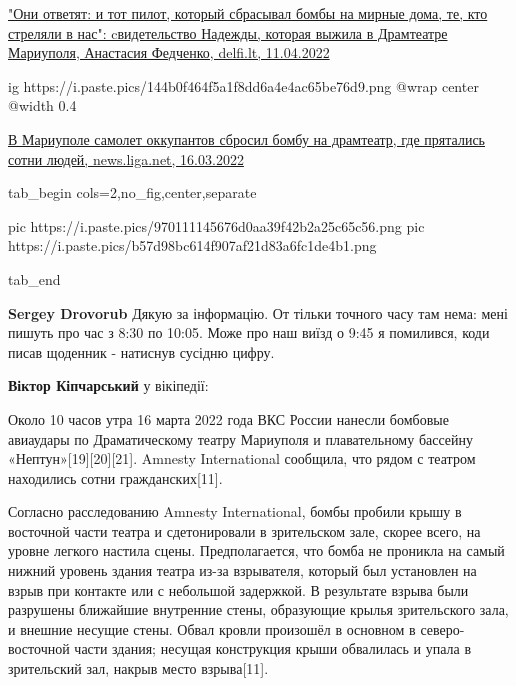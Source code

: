  
 
 
 
 

\begin{itemize} %

\href{https://www.delfi.lt/ru/news/live/oni-otvetyat-i-tot-pilot-kotoryj-sbrasyval-bomby-na-mirnye-doma-te-kto-strelyali-v-nas-cvidetelstvo-nadezhdy-kotoraya-vyzhila-v-dramteatre-mariupolya.d?id=89935973}{%
"Они ответят: и тот пилот, который сбрасывал бомбы на мирные дома, те, кто
стреляли в нас": cвидетельство Надежды, которая выжила в Драмтеатре Мариуполя, %
Анастасия Федченко, delfi.lt, 11.04.2022%
}

\ifcmt
  ig https://i.paste.pics/144b0f464f5a1f8dd6a4e4ac65be76d9.png
  @wrap center
  @width 0.4
\fi


\href{https://news.liga.net/politics/news/v-mariupole-samolet-okkupantov-sbrosil-bombu-na-zdanie-dramteatra-gde-pryatalis-sotni-lyud}{%
В Мариуполе самолет оккупантов сбросил бомбу на драмтеатр, где прятались сотни людей, news.liga.net, 16.03.2022%
}

\ifcmt
  tab_begin cols=2,no_fig,center,separate

     pic https://i.paste.pics/970111145676d0aa39f42b2a25c65c56.png
		 pic https://i.paste.pics/b57d98bc614f907af21d83a6fc1de4b1.png

  tab_end
\fi

\textbf{Sergey Drovorub} Дякую за інформацію.
От тільки точного часу там нема: мені пишуть про час з 8:30 по 10:05.
Може про наш виїзд о 9:45 я помилився, коди писав щоденник - натиснув сусідню цифру.

\textbf{Віктор Кіпчарський} у вікіпедії:

Около 10 часов утра 16 марта 2022 года ВКС России нанесли бомбовые авиаудары по
Драматическому театру Мариуполя и плавательному бассейну «Нептун»[19][20][21].
Amnesty International сообщила, что рядом с театром находились сотни
гражданских[11].

Согласно расследованию Amnesty International, бомбы пробили крышу в восточной
части театра и сдетонировали в зрительском зале, скорее всего, на уровне
легкого настила сцены. Предполагается, что бомба не проникла на самый нижний
уровень здания театра из-за взрывателя, который был установлен на взрыв при
контакте или с небольшой задержкой. В результате взрыва были разрушены
ближайшие внутренние стены, образующие крылья зрительского зала, и внешние
несущие стены. Обвал кровли произошёл в основном в северо-восточной части
здания; несущая конструкция крыши обвалилась и упала в зрительский зал, накрыв
место взрыва[11].


\end{itemize}
